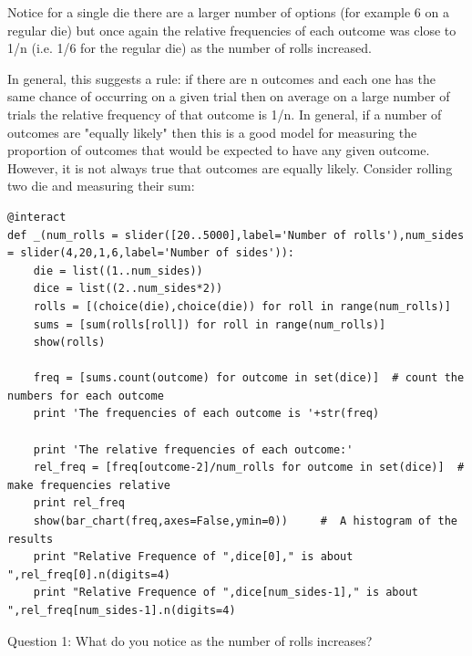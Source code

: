 \documentclass[10pt,]{book}
\theoremstyle{plain}
\theoremstyle{definition}
\theoremstyle{definition}
\theoremstyle{definition}
\numberwithin{equation}{section}
\begin{document}
%
\par
Notice for a single die there are a larger number of options (for example 6 on a regular
	die) but once again the relative frequencies of each  outcome was close to 1/n (i.e. 1/6 for the regular die)
	as the number of rolls increased.%
\par
In general, this suggests a rule: if there are n outcomes and each one has the same
	chance of occurring on a given trial then on average on a large number of trials the relative
	frequency of that outcome is 1/n.
	In general, if a number of outcomes are "equally likely" then this is a good model for measuring
	the proportion of outcomes that would be expected to have any given outcome. However, it is not
	always true that outcomes are equally likely. Consider rolling two die and measuring their sum:%
\par

\begin{lstlisting}[style=sageinput]
@interact
def _(num_rolls = slider([20..5000],label='Number of rolls'),num_sides = slider(4,20,1,6,label='Number of sides')):
    die = list((1..num_sides))
    dice = list((2..num_sides*2))
    rolls = [(choice(die),choice(die)) for roll in range(num_rolls)]
    sums = [sum(rolls[roll]) for roll in range(num_rolls)]
    show(rolls)   

    freq = [sums.count(outcome) for outcome in set(dice)]  # count the numbers for each outcome
    print 'The frequencies of each outcome is '+str(freq)
    
    print 'The relative frequencies of each outcome:'
    rel_freq = [freq[outcome-2]/num_rolls for outcome in set(dice)]  # make frequencies relative
    print rel_freq        
    show(bar_chart(freq,axes=False,ymin=0))     #  A histogram of the results
    print "Relative Frequence of ",dice[0]," is about ",rel_freq[0].n(digits=4)
    print "Relative Frequence of ",dice[num_sides-1]," is about ",rel_freq[num_sides-1].n(digits=4)
\end{lstlisting}

%
\par

	Question 1: What do you notice as the number of rolls increases?
\par
\end{document}

